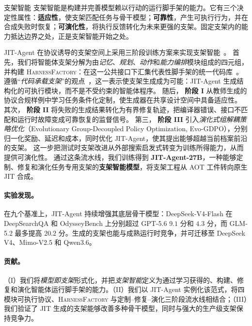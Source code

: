 \documentclass{article}
\newcommand{\ourmethod}{JIT-Agent\xspace}
\begin{document}
\begin{insightbox}{支架智能}
支架智能是构建并完善模型赖以行动的运行脚手架的能力。它有三个决定性属性：\textbf{适应性}，使支架匹配任务与骨干模型；\textbf{可靠性}，产生可执行行为，并在合成失败时恢复；\textbf{可演化性}，将执行反馈转化为未来更强的支架。固定支架内的能力抵达边界之处，正是支架智能开始之处。
\end{insightbox}

\ourmethod 在协议诱导的支架空间上采用三阶段训练方案来实现支架智能~\citep{meng2026agent,zhou2026externalizationllmagentsunified}。
首先，我们将智能体支架分解为由\textit{记忆}、\textit{规划}、\textit{动作}和\textit{能力编排}模块组成的四元组，并构建 \textsc{HarnessFactory}：在这一公共接口下汇集代表性脚手架的统一代码库~\citep{hu2025memoryageaiagentssurvey,erdogan2025plan,yao2023reactsynergizingreasoningacting,xu2026agentskillslargelanguage}。
遵循“\textit{代码承载支架}”的观点~\citep{ning2026code,pan2026natural}，这一表示使支架生成成为可能：\ourmethod{} 生成结构化的可执行模块，而不是不受约束的智能体程序。
随后，\textbf{ 阶段 I} 从教师生成的协议合规样例中学习任务条件化定制，使生成器在共享设计空间中具备适应性。
其次，\textbf{ 阶段 II} 将失败的生成结果转化为有界修复轨迹，把编译器错误、接口不匹配和运行时故障变成可靠恢复的监督信号。
第三，\textbf{ 阶段 III} 引入\textit{演化式组解耦策略优化}（Evolutionary Group-Decoupled Policy Optimization, Evo-GDPO），分别归一化奖励、延迟和成本，同时优化 \ourmethod{}，使其提出能够超越当前档案前沿的支架。
这一步把测试时支架改进从外部搜索启发式转变为训练所得能力，从而提供可演化性。
通过这条流水线，我们训练得到 \textbf{JIT-Agent-27B}，一种能够定制、修复和演化任务专用支架的\textbf{支架智能模型}，将支架工程从 AOT 工件转向原生 JIT 合成。

\vspace{-0.5em}
\paragraph{实验发现。}
在九个基准上，\ourmethod 持续增强其底层骨干模型：DeepSeek-V4-Flash 在 DeepSearchQA 和 OdysseyBench 上分别超过 GPT-5.6 $9.1$ 分和 $4.3$ 分，而 GLM-5.2 最多提高 $20.2$ 分。生成的支架也能与成熟运行时竞争，并可迁移至 DeepSeek V4、Mimo-V2.5 和 Qwen3.6。

\vspace{-0.5em}
\paragraph{贡献。} （I）我们将\textit{模型即支架}形式化，并把\textit{支架智能}定义为通过学习获得的、构建、修复和演化智能体运行脚手架的能力。（II）我们以 \ourmethod 实例化该范式，将四模块可执行协议、\textsc{HarnessFactory} 与定制--修复--演化三阶段流水线相结合；（III）我们验证了 JIT 生成的支架能够改善多种骨干模型，同时与强大的生产级支架保持竞争力。
\end{document}
